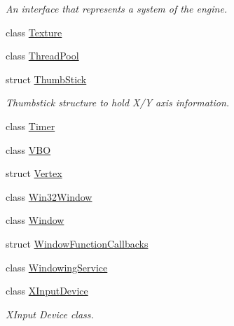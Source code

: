 \begin{DoxyCompactItemize}
\begin{DoxyCompactList}\small\item\em An interface that represents a system of the engine. \end{DoxyCompactList}\item 
class \hyperlink{class_blade_1_1_texture}{Texture}
\item 
class \hyperlink{class_blade_1_1_thread_pool}{Thread\+Pool}
\item 
struct \hyperlink{struct_blade_1_1_thumb_stick}{Thumb\+Stick}
\begin{DoxyCompactList}\small\item\em Thumbstick structure to hold X/Y axis information. \end{DoxyCompactList}\item 
class \hyperlink{class_blade_1_1_timer}{Timer}
\item 
class \hyperlink{class_blade_1_1_v_b_o}{V\+BO}
\item 
struct \hyperlink{struct_blade_1_1_vertex}{Vertex}
\item 
class \hyperlink{class_blade_1_1_win32_window}{Win32\+Window}
\item 
class \hyperlink{class_blade_1_1_window}{Window}
\item 
struct \hyperlink{struct_blade_1_1_window_function_callbacks}{Window\+Function\+Callbacks}
\item 
class \hyperlink{class_blade_1_1_windowing_service}{Windowing\+Service}
\item 
class \hyperlink{class_blade_1_1_x_input_device}{X\+Input\+Device}
\begin{DoxyCompactList}\small\item\em X\+Input Device class. \end{DoxyCompactList}\end{DoxyCompactItemize}
